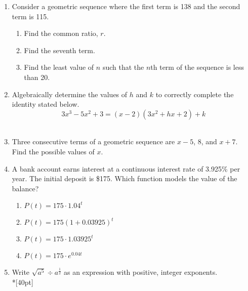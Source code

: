 \documentclass[12pt, oneside]{article}
\begin{document}
\begin{enumerate}
\item Consider a geometric sequence where the first term is 138 and the second term is 115.
\begin{enumerate}
    \item Find the common ratio, $r$.\\[20pt]
        \begin{flushright}[1]\end{flushright}
    \item Find the seventh term.\\[80pt]
        \begin{flushright}[2]\end{flushright}
    \item Find the least value of $n$ such that the $n$th term of the sequence is less than 20. \\[80pt]
        \begin{flushright}[3]\end{flushright}
\end{enumerate}

\newpage
\item Algebraically determine the values of $h$ and $k$ to correctly complete the identity stated below.
\[3x^3-5x^2+3=(x-2)(3x^2+hx+2)+k\] \\[2in] 
        \begin{flushright}[4]\end{flushright}

\item Three consecutive terms of a geometric sequence are $x-5$, 8, and $x+7$.\\
Find the possible values of $x$.\\[3in]
    \begin{flushright}[6]\end{flushright}

\newpage
\item A bank account earns interest at a continuous interest rate of 3.925\% per year. The initial deposit is \$175. Which function models the value of the balance? \qquad [2]
\begin{enumerate}
    \item $P(t)=175 \cdot 1.04^{t}$
    \item $P(t)=175 (1+0.03925)^{t}$
    \item $P(t)=175 \cdot 1.03925^{t}$
    \item $P(t)=175 \cdot e^{0.04t}$
\end{enumerate}

\item Write $\sqrt{a^5} \div a^{\frac{1}{2}}$ as an expression with positive, integer exponents.\\*[40pt]
    \begin{flushright}[3]\end{flushright}


\end{enumerate}
\end{document}
